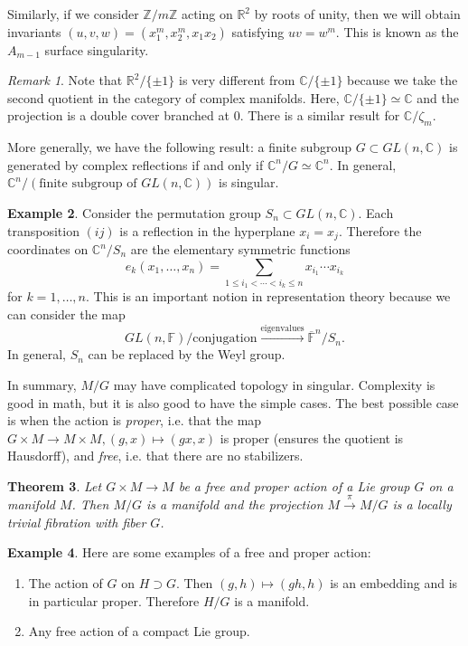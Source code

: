 \documentclass[leqno, openany]{memoir}
\newtheorem{thm}{Theorem}[section]
\theoremstyle{definition}
\newtheorem{exm}[thm]{Example}
\theoremstyle{remark}
\newtheorem{rmk}[thm]{Remark}
\theoremstyle{plain}
\theoremstyle{definition}
\theoremstyle{remark}
\newcommand{\F}{\mathbb{F}}
\newcommand{\R}{\mathbb{R}}
\newcommand{\C}{\mathbb{C}}
\newcommand{\Z}{\mathbb{Z}}
\newcommand{\ol}[1]{\overline{#1}}
\begin{document}
Similarly, if we consider $\Z/m\Z$ acting on $\R^2$  by roots of unity, then we
will obtain invariants $(u,v,w) = (x_1^m, x_2^m, x_1x_2)$ satisfying $uv =
w^m$. This is known as the $A_{m-1}$ surface singularity.

\begin{rmk} Note that $\R^2 / \{ \pm 1 \}$ is very different from $\C / \{ \pm
    1 \}$ because we take the second quotient in the category of complex
    manifolds. Here, $\C / \{ \pm 1 \} \simeq \C$ and the projection is a
    double cover branched at $0$. There is a similar result for $\C / \zeta_m$. 

    More generally, we have the following result: a finite subgroup $G \subset
GL(n,\C)$ is generated by complex reflections if and only if $\C^n / G \simeq
\C^n$. In general, $\C^n / (\text{finite subgroup of }GL(n,\C))$ is singular.
\end{rmk}

\begin{exm} Consider the permutation group $S_n \subset GL(n,\C)$. Each
    transposition $(ij)$ is a reflection in the hyperplane $x_i = x_j$.
    Therefore the coordinates on $\C^n / S_n$ are the elementary symmetric
    functions \[ e_k(x_1, \ldots, x_n) = \sum_{1 \leq i_1 < \cdots < i_k \leq
    n} x_{i_1} \cdots x_{i_k} \] for $k = 1, \ldots, n$. This is an important
    notion in representation theory because we can consider the map \[ GL(n,
    \F) / \text{conjugation} \xrightarrow{\text{eigenvalues}} \ol{\F}^n / S_n.
\] In general, $S_n$ can be replaced by the Weyl group.  \end{exm}

In summary, $M/G$ may have complicated topology in singular. Complexity is good
in math, but it is also good to have the simple cases. The best possible case
is when the action is \textit{proper}, i.e. that the map $G \times M \to M
\times M, (g,x) \mapsto (gx,x)$ is proper (ensures the quotient is Hausdorff),
and \textit{free}, i.e. that there are no stabilizers.

\begin{thm} \label{thm:freeproper} Let $G \times M \to M$ be a free and proper
    action of a Lie group $G$ on a manifold $M$. Then $M/G$ is a manifold and
    the projection $M \xrightarrow{\pi} M/G$ is a locally trivial fibration
    with fiber $G$.  \end{thm}

\begin{exm} Here are some examples of a free and proper action:
    \begin{enumerate} \item The action of $G$ on $H \supset G$. Then $(g,h)
        \mapsto (gh,h)$ is an embedding and is in particular proper. Therefore
        $H/G$ is a manifold.  \item Any free action of a compact Lie group.
\end{enumerate} \end{exm}
\end{document}
